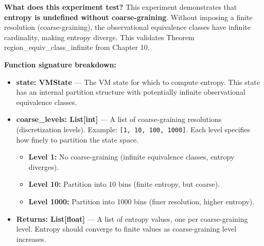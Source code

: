 \textbf{What does this experiment test?} This experiment demonstrates that \textbf{entropy is undefined without coarse-graining}. Without imposing a finite resolution (coarse-graining), the observational equivalence classes have infinite cardinality, making entropy diverge. This validates Theorem region\_equiv\_class\_infinite from Chapter 10.

\textbf{Function signature breakdown:}
\begin{itemize}
    \item \textbf{state: VMState} — The VM state for which to compute entropy. This state has an internal partition structure with potentially infinite observational equivalence classes.
    
    \item \textbf{coarse\_levels: List[int]} — A list of coarse-graining resolutions (discretization levels). Example: \texttt{[1, 10, 100, 1000]}. Each level specifies how finely to partition the state space.
    \begin{itemize}
        \item \textbf{Level 1:} No coarse-graining (infinite equivalence classes, entropy diverges).
        \item \textbf{Level 10:} Partition into 10 bins (finite entropy, but coarse).
        \item \textbf{Level 1000:} Partition into 1000 bins (finer resolution, higher entropy).
    \end{itemize}
    
    \item \textbf{Returns: List[float]} — A list of entropy values, one per coarse-graining level. Entropy should converge to finite values as coarse-graining level increases.
\end{itemize}

